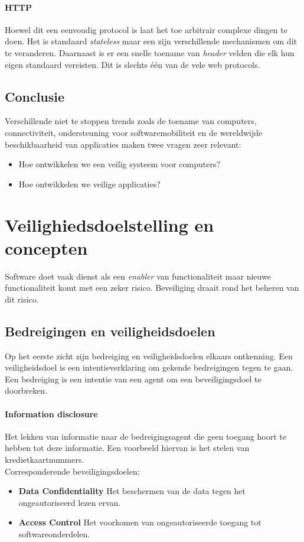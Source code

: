 \documentclass[../main.tex]{subfiles}
\begin{document}
\paragraph{HTTP} Hoewel dit een eenvoudig protocol is laat het toe arbitrair complexe dingen te doen. Het is standaard \textit{stateless} maar een zijn verschillende mechanismen om dit te veranderen. Daarnaast is er een snelle toename van \textit{header} velden die elk hun eigen standaard vereisten. Dit is slechts \'e\'en van de vele web protocols.

\subsection{Conclusie}
Verschillende niet te stoppen trends zoals de toename van computers, connectiviteit, ondersteuning voor softwaremobiliteit en de wereldwijde beschikbaarheid van applicaties maken twee vragen zeer relevant:
\begin{itemize}
	\item Hoe ontwikkelen we een veilig systeem voor computers?
	\item Hoe ontwikkelen we veilige applicaties?
\end{itemize}

\section{Veilighiedsdoelstelling en concepten}
Software doet vaak dienst als een \textit{enabler} van functionaliteit maar nieuwe functionaliteit komt met een zeker risico. Beveiliging draait rond het beheren van dit risico.
\subsection{Bedreigingen en veiligheidsdoelen}
Op het eerste zicht zijn bedreiging en veiligheidsdoelen elkaars ontkenning. Een veiligheidsdoel is een intentieverklaring om gekende bedreigingen tegen te gaan. Een bedreiging is een intentie van een agent om een beveiligingsdoel te doorbreken.

\paragraph{Information disclosure} 
Het lekken van informatie naar de bedreigingsagent die geen toegang hoort te hebben tot deze informatie. Een voorbeeld hiervan is het stelen van kredietkaartnummers. 
\\
Corresponderende beveiligingsdoelen:
\begin{itemize}
	\item \textbf{Data Confidentiality} Het beschermen van de data tegen het ongeautoriseerd lezen ervan.
	\item \textbf{Access Control} Het voorkomen van ongeautoriseerde toegang tot softwareonderdelen.
\end{itemize}
\end{document}
